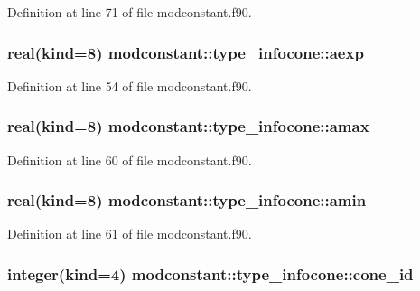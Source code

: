 Definition at line 71 of file modconstant.\-f90.

\hypertarget{structmodconstant_1_1type__infocone_ac3a5d891e4c144a6391de4445dd2e675}{
\subsubsection[{aexp}]{\setlength{\rightskip}{0pt plus 5cm}real(kind=8) modconstant\-::type\-\_\-infocone\-::aexp}}\label{structmodconstant_1_1type__infocone_ac3a5d891e4c144a6391de4445dd2e675}


Definition at line 54 of file modconstant.\-f90.

\hypertarget{structmodconstant_1_1type__infocone_a4f92a39c770ead2115957fb7e05ce22a}{
\subsubsection[{amax}]{\setlength{\rightskip}{0pt plus 5cm}real(kind=8) modconstant\-::type\-\_\-infocone\-::amax}}\label{structmodconstant_1_1type__infocone_a4f92a39c770ead2115957fb7e05ce22a}


Definition at line 60 of file modconstant.\-f90.

\hypertarget{structmodconstant_1_1type__infocone_a4c48af6759d2e76017ed219c17b488ff}{
\subsubsection[{amin}]{\setlength{\rightskip}{0pt plus 5cm}real(kind=8) modconstant\-::type\-\_\-infocone\-::amin}}\label{structmodconstant_1_1type__infocone_a4c48af6759d2e76017ed219c17b488ff}


Definition at line 61 of file modconstant.\-f90.

\hypertarget{structmodconstant_1_1type__infocone_aef4e47022a667b8d2dad299fe132fd5c}{
\subsubsection[{cone\-\_\-id}]{\setlength{\rightskip}{0pt plus 5cm}integer(kind=4) modconstant\-::type\-\_\-infocone\-::cone\-\_\-id}}\label{structmodconstant_1_1type__infocone_aef4e47022a667b8d2dad299fe132fd5c}


